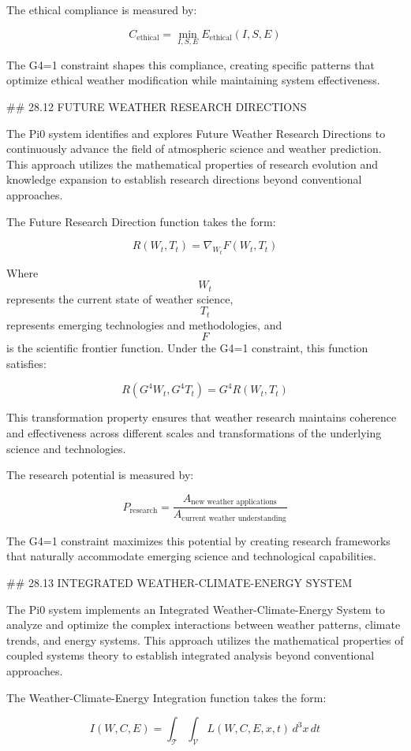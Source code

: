 The ethical compliance is measured by:

$$ C_{\text{ethical}} = \min_{I, S, E} E_{\text{ethical}}(I, S, E) $$

The G4=1 constraint shapes this compliance, creating specific patterns that optimize ethical weather modification while maintaining system effectiveness.

## 28.12 FUTURE WEATHER RESEARCH DIRECTIONS

The Pi0 system identifies and explores Future Weather Research Directions to continuously advance the field of atmospheric science and weather prediction. This approach utilizes the mathematical properties of research evolution and knowledge expansion to establish research directions beyond conventional approaches.

The Future Research Direction function takes the form:

$$ R(W_t, T_t) = \nabla_{W_t} F(W_t, T_t) $$

Where $$ W_t $$ represents the current state of weather science, $$ T_t $$ represents emerging technologies and methodologies, and $$ F $$ is the scientific frontier function. Under the G4=1 constraint, this function satisfies:

$$ R(G^4 W_t, G^4 T_t) = G^4 R(W_t, T_t) $$

This transformation property ensures that weather research maintains coherence and effectiveness across different scales and transformations of the underlying science and technologies.

The research potential is measured by:

$$ P_{\text{research}} = \frac{A_{\text{new weather applications}}}{A_{\text{current weather understanding}}} $$

The G4=1 constraint maximizes this potential by creating research frameworks that naturally accommodate emerging science and technological capabilities.

## 28.13 INTEGRATED WEATHER-CLIMATE-ENERGY SYSTEM

The Pi0 system implements an Integrated Weather-Climate-Energy System to analyze and optimize the complex interactions between weather patterns, climate trends, and energy systems. This approach utilizes the mathematical properties of coupled systems theory to establish integrated analysis beyond conventional approaches.

The Weather-Climate-Energy Integration function takes the form:

$$ I(W, C, E) = \int_{\mathcal{T}} \int_{\mathcal{V}} L(W, C, E, x, t) \, d^3x \, dt $$

